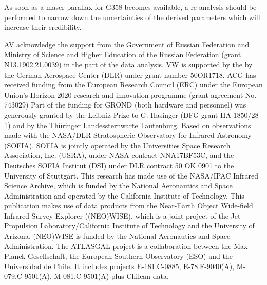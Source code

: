 
As soon as a maser parallax for G358 becomes available, a re-analysis should be performed to narrow down the uncertainties of the derived parameters which will increase their credibility.

\begin{acknowledgements}

AV acknowledge the support from the Government of Russian Federation and Ministry of Science and Higher Education of the Russian Federation (grant N13.1902.21.0039) in the part of the data analysis.
VW is supported by the by the German Aerospace Center (DLR) under grant number 50OR1718.
ACG has received funding from the European Research Council (ERC) under the European Union’s Horizon 2020 research and innovation programme (grant agreement No. 743029)
Part of the funding for GROND (both hardware and personnel) was generously granted by the Leibniz-Prize to G. Hasinger (DFG grant HA 1850/28-1) and by the Th\"uringer Landessternwarte Tautenburg.
Based on observations made with the NASA/DLR Stratospheric Observatory for Infrared Astronomy (SOFIA). SOFIA is jointly operated by the Universities Space Research Association, Inc. (USRA), under NASA contract NNA17BF53C, and the Deutsches SOFIA Institut (DSI) under DLR contract 50 OK 0901 to the University of Stuttgart.
This research has made use of the NASA/IPAC Infrared Science Archive, which is funded by the National Aeronautics and Space Administration and operated by the California Institute of Technology.
This publication makes use of data products from the Near-Earth Object Wide-field Infrared Survey Explorer ((NEO)WISE), which is a joint project of the Jet Propulsion Laboratory/California Institute of Technology and the University of Arizona. (NEO)WISE is funded by the National Aeronautics and Space Administration.
The ATLASGAL project is a collaboration between the Max-Planck-Gesellschaft, the European Southern Observatory (ESO) and the Universidad de Chile. It includes projects E-181.C-0885,  E-78.F-9040(A), M-079.C-9501(A), M-081.C-9501(A) plus Chilean data. 
\end{acknowledgements}


